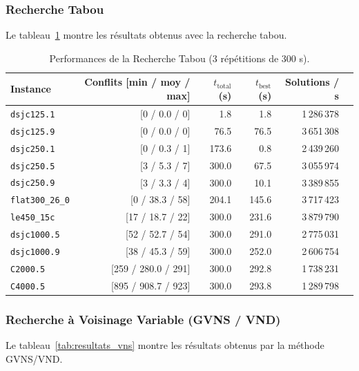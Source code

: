\documentclass{article}
\begin{document}
\subsubsection{Recherche Tabou}
Le tableau~\ref{tab:resultats_tabou} montre les résultats obtenus avec la recherche tabou.
\begin{table}[H]
\centering
\small
\setlength{\tabcolsep}{5pt}
\begin{tabular}{lrrrrr}
\toprule
\textbf{Instance} & \textbf{Conflits [min / moy / max]} & \textbf{$t_{\text{total}}$ (s)} & \textbf{$t_{\text{best}}$ (s)} & \textbf{Solutions / s} \\
\midrule
\texttt{dsjc125.1}      & [0 / 0.0 / 0]       & 1.8   & 1.8   & 1\,286\,378 \\
\texttt{dsjc125.9}      & [0 / 0.0 / 0]       & 76.5  & 76.5  & 3\,651\,308 \\
\texttt{dsjc250.1}      & [0 / 0.3 / 1]       & 173.6 & 0.8   & 2\,439\,260 \\
\texttt{dsjc250.5}      & [3 / 5.3 / 7]       & 300.0 & 67.5  & 3\,055\,974 \\
\texttt{dsjc250.9}      & [3 / 3.3 / 4]       & 300.0 & 10.1  & 3\,389\,855 \\
\texttt{flat300\_26\_0} & [0 / 38.3 / 58]     & 204.1 & 145.6 & 3\,717\,423 \\
\texttt{le450\_15c}     & [17 / 18.7 / 22]    & 300.0 & 231.6 & 3\,879\,790 \\
\texttt{dsjc1000.5}     & [52 / 52.7 / 54]    & 300.0 & 291.0 & 2\,775\,031 \\
\texttt{dsjc1000.9}     & [38 / 45.3 / 59]    & 300.0 & 252.0 & 2\,606\,754 \\
\texttt{C2000.5}        & [259 / 280.0 / 291] & 300.0 & 292.8 & 1\,738\,231 \\
\texttt{C4000.5}        & [895 / 908.7 / 923] & 300.0 & 293.8 & 1\,289\,798 \\
\bottomrule
\end{tabular}
\caption{Performances de la Recherche Tabou (3 répétitions de 300 s).}
\label{tab:resultats_tabou}
\end{table}

\subsubsection{Recherche à Voisinage Variable (GVNS / VND)}
Le tableau~\ref{tab:resultats_vns} montre les résultats obtenus par la méthode GVNS/VND.
\end{document}
